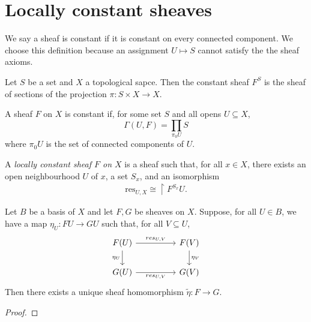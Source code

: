 \documentclass{article}
\begin{document}
\section{Locally constant sheaves}\label{sec:locally_constant_sheaves}

We say a sheaf is constant if it is constant on every connected component. We choose this
definition because an assignment $U\mapsto S$ cannot satisfy the the sheaf axioms.

\begin{definition}
  Let $S$ be a set and $X$ a topological sapce. Then
  the constant sheaf $F^S$ is the sheaf of sections
  of the projection $\pi:S\times X\to X$.
\end{definition}


\begin{definition}
  A sheaf $F$ on $X$ is constant if, for some set $S$ and all opens $U\subseteq X$,
  \begin{equation}
    \Gamma(U,F) = \prod_{\pi_0U}S
  \end{equation}
  where $\pi_0U$ is the set of connected components of $U$.
\end{definition}

\begin{definition}
  A \emph{locally constant sheaf $F$ on $X$} is a sheaf such that,
  for all $x\in X$, there exists an open neighbourhood $U$ of $x$,
  a set $S_x$, and an isomorphism
  \begin{align*}
    \text{res}_{U,X} \cong \restriction{F^{S_x}}{U}.
  \end{align*}
\end{definition}

\begin{lemma}
  Let $B$ be a basis of $X$ and let $F,G$ be sheaves on $X$. Suppose, for all $U\in B$,
  we have a map $\eta_U:FU\to GU$ such that, for all $V\subseteq U$,
  \begin{equation}
    \begin{tikzcd}
      F(U) && F(V) \\
      G(U) && G(V)
      \arrow["res_{U,V}", from=1-1, to=1-3]
      \arrow["{\eta_U}"', from=1-1, to=2-1]
      \arrow["{\eta_V}", from=1-3, to=2-3]
      \arrow["res_{U,V}"', from=2-1, to=2-3]
    \end{tikzcd}
  \end{equation}
  Then there exists a unique sheaf homomorphism $\tilde\eta : F\to G$.
  \begin{proof}
    \missingproof
  \end{proof}
\end{lemma}
\end{document}
